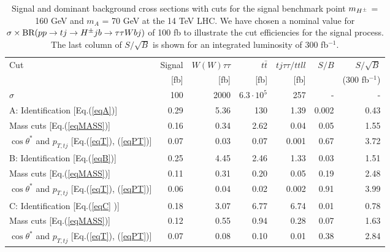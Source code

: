 \begin{table}[h]
\centering
\resizebox{14cm}{!} {
\begin{tabular}{ |l | r |r r r |r r|}  \hline
Cut 		 														&Signal 	&		$W(W)\tau\tau$ 	&	$t\bar{t}$		&$tj\tau\tau/ttll$	&$S/B$	&$S/\sqrt{B}$	\\
																&[fb]		&			[fb]		&	[fb]					&[fb]		&		&	(300 fb$^{-1}$)		\\
\hline
$\sigma$    														&100 		&		  2000		&    $6.3 \cdot 10^5$  				& 257		&	-			&	-	\\
\hline
A: Identification [Eq.(\ref{eqA})] 		 								&0.29	 	&           5.36 		&    130			& 1.39		&	 0.002     	& 0.43	\\
\phantom{A:} 
Mass cuts [Eq.(\ref{eqMASS})]											&0.16	 	&           0.34 		&    2.62				& 0.04		&	 0.05     	& 1.55	\\
\phantom{A:} $\cos\theta^*$ and $p_{T,tj}$ [Eq.(\ref{eqT}), (\ref{eqPT})]&0.07	 	&           0.03 		&    0.07					& 0.001		& 	 0.67     	& 3.72	\\
\hline
B: Identification [Eq.(\ref{eqB})]	 									&0.25	 	&           4.45 		&    2.46					& 1.33	&	 0.03    		& 1.51	\\
\phantom{B:} Mass cuts [Eq.(\ref{eqMASS})]								&0.11	 	&           0.31 		&    0.20					& 0.05	&	 0.19    		& 2.48	\\
\phantom{B:} $\cos\theta^*$ and $p_{T,tj}$ [Eq.(\ref{eqT}), (\ref{eqPT})]&0.06	 	&           0.04 		&    0.02					& 0.002		&	 0.91    		& 3.99	\\
\hline
C: Identification [Eq.(\ref{eqC} )]	 									&0.18	 	&           3.07 		&    6.77				& 6.74		& 	0.01     	& 0.78  \\
\phantom{C:} Mass cuts [Eq.(\ref{eqMASS})]								&0.12	 	&           0.55 		&    0.94				& 0.28		& 	0.07     	& 1.63  \\
\phantom{C:} $\cos\theta^*$ and $p_{T,tj}$ [Eq.(\ref{eqT}), (\ref{eqPT})]&0.07	 	&           0.08 		&    0.10					& 0.01		& 	0.38     	& 2.84 \\
\hline
\end{tabular}
}
\caption{Signal and dominant background cross sections with cuts for the signal benchmark point $m_{H^{\pm}}$ = 160 GeV   and $m_A$ = 70 GeV at the 14 TeV LHC.  We have chosen a nominal value for $\sigma \times {\text{BR}}(pp \rightarrow tj \rightarrow H^{\pm}  j b \rightarrow \tau\tau W b j )$ of 100 fb to illustrate the cut efficiencies for the signal process.  The last column of $S/\sqrt{B}$ is shown for an integrated luminosity of 300 fb$^{-1}$.  }
\label{tab:tj}
\end{table}

